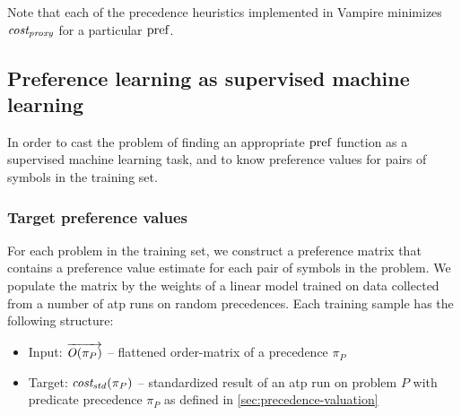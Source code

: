 Note that each of the precedence heuristics implemented in Vampire minimizes \(\operatorname{\mathit{cost_{proxy}}}\)
for a particular \(\operatorname{pref}\).

\subsection{Preference learning as supervised machine learning}

In order to cast the problem of finding an appropriate \(\operatorname{pref}\) function
as a supervised machine learning task,
and to know preference values for pairs of symbols in the training set.

\subsubsection{Target preference values}
\label{sec:target-preference-values}

For each problem in the training set, we construct a preference matrix that contains a preference
value estimate for each pair of symbols in the problem.
We populate the matrix by the weights of a linear model trained on data
collected from a number of \gls{atp} runs on random precedences.
Each training sample has the following structure:

\begin{itemize}
	\item Input: \(\overrightarrow{\operatorname{\mathit{O}}(\pi_P)}\) --
	flattened \gls{order-matrix} of a precedence \(\pi_P\)
	\item Target: \(\operatorname{\mathit{cost_{std}}}(\pi_P)\) --
	standardized result of an \gls{atp} run on problem \(P\) with predicate precedence \(\pi_P\)
	as defined in \autoref{sec:precedence-valuation}
\end{itemize}

